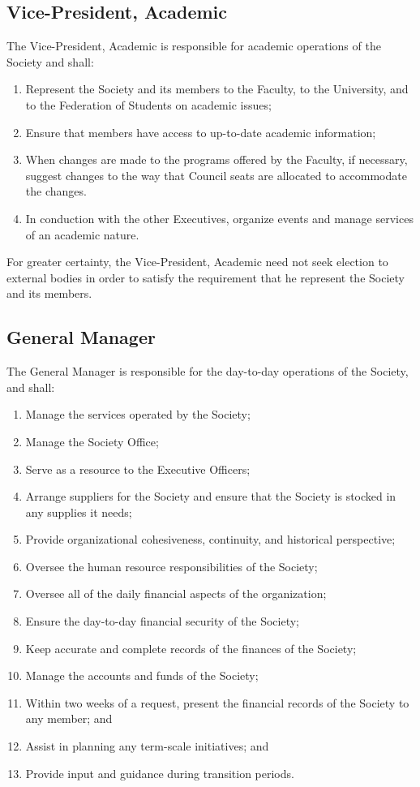 \subsection{Vice-President, Academic}
The Vice-President, Academic is responsible for academic operations of the
Society and shall:
\begin{enumerate}
  \item Represent the Society and its members to the Faculty, to the University,
    and to the Federation of Students on academic issues;
  \item Ensure that members have access to up-to-date academic information;
  \item When changes are made to the programs offered by the Faculty, if
    necessary, suggest changes to the way that Council seats are allocated to
    accommodate the changes.
  \item In conduction with the other Executives, organize events and manage
    services of an academic nature.
\end{enumerate}

For greater certainty, the Vice-President, Academic need not seek election to
external bodies in order to satisfy the requirement that he represent the
Society and its members.

\subsection{General Manager}
The General Manager is responsible for the day-to-day operations of the 
Society, and shall:
\begin{enumerate}
    \item Manage the services operated by the Society;
    \item Manage the Society Office;
    \item Serve as a resource to the Executive Officers;
    \item Arrange suppliers for the Society and ensure that the Society is
        stocked in any supplies it needs;
    \item Provide organizational cohesiveness, continuity, and historical
        perspective;
    \item Oversee the human resource responsibilities of the Society;
    \item Oversee all of the daily financial aspects of the organization;
    \item Ensure the day-to-day financial security of the Society;
    \item Keep accurate and complete records of the finances of the Society;
    \item Manage the accounts and funds of the Society;
    \item Within two weeks of a request, present the financial records of the
        Society to any member; and
    \item Assist in planning any term-scale initiatives; and
    \item Provide input and guidance during transition periods.
\end{enumerate}

